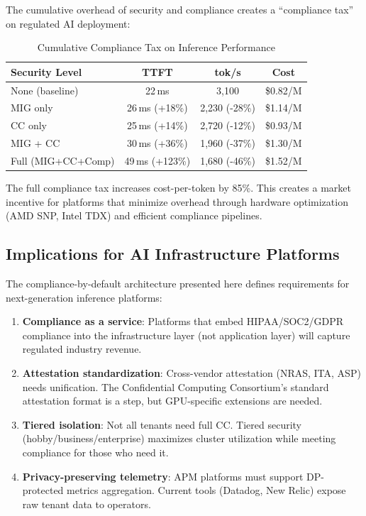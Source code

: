 \documentclass[conference,10pt]{IEEEtran}
\begin{document}
The cumulative overhead of security and compliance creates a ``compliance tax'' on regulated AI deployment:

\begin{table}[!htbp]
\caption{Cumulative Compliance Tax on Inference Performance}
\label{tab:tax}
\centering\footnotesize
\begin{tabular}{@{}lccc@{}}
\toprule
\textbf{Security Level} & \textbf{TTFT} & \textbf{tok/s} & \textbf{Cost} \\
\midrule
None (baseline) & 22\,ms & 3,100 & \$0.82/M \\
MIG only & 26\,ms (+18\%) & 2,230 (-28\%) & \$1.14/M \\
CC only & 25\,ms (+14\%) & 2,720 (-12\%) & \$0.93/M \\
MIG + CC & 30\,ms (+36\%) & 1,960 (-37\%) & \$1.30/M \\
Full (MIG+CC+Comp) & 49\,ms (+123\%) & 1,680 (-46\%) & \$1.52/M \\
\bottomrule
\end{tabular}
\end{table}

The full compliance tax increases cost-per-token by 85\%. This creates a market incentive for platforms that minimize overhead through hardware optimization (AMD SNP, Intel TDX) and efficient compliance pipelines.

\subsection{Implications for AI Infrastructure Platforms}

The compliance-by-default architecture presented here defines requirements for next-generation inference platforms:

\begin{enumerate}
\item \textbf{Compliance as a service}: Platforms that embed HIPAA/SOC2/GDPR compliance into the infrastructure layer (not application layer) will capture regulated industry revenue.
\item \textbf{Attestation standardization}: Cross-vendor attestation (NRAS, ITA, ASP) needs unification. The Confidential Computing Consortium's standard attestation format is a step, but GPU-specific extensions are needed.
\item \textbf{Tiered isolation}: Not all tenants need full CC. Tiered security (hobby/business/enterprise) maximizes cluster utilization while meeting compliance for those who need it.
\item \textbf{Privacy-preserving telemetry}: APM platforms must support DP-protected metrics aggregation. Current tools (Datadog, New Relic) expose raw tenant data to operators.
\end{enumerate}
\end{document}
